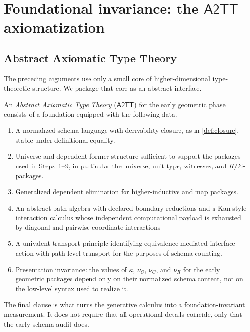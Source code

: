 \documentclass{lmcs}
\newcommand{\ATwoTT}{\mathsf{A2TT}}
\begin{document}
\section{Foundational invariance: the \texorpdfstring{$\ATwoTT$}{A2TT} axiomatization}
\label{sec:a2tt}

\subsection{Abstract Axiomatic Type Theory}

The preceding arguments use only a small core of higher-dimensional type-theoretic structure. We package that core as an abstract interface.

\begin{defi}
\label{def:a2tt}
An \emph{Abstract Axiomatic Type Theory} ($\ATwoTT$) for the early geometric phase consists of a foundation equipped with the following data.
\begin{enumerate}
    \item A normalized schema language with derivability closure, as in \autoref{def:closure}, stable under definitional equality.
    \item Universe and dependent-former structure sufficient to support the packages used in Steps~1--9, in particular the universe, unit type, witnesses, and $\Pi/\Sigma$-packages.
    \item Generalized dependent elimination for higher-inductive and map packages.
    \item An abstract path algebra with declared boundary reductions and a Kan-style interaction calculus whose independent computational payload is exhausted by diagonal and pairwise coordinate interactions.
    \item A univalent transport principle identifying equivalence-mediated interface action with path-level transport for the purposes of schema counting.
    \item Presentation invariance: the values of $\kappa$, $\nu_G$, $\nu_C$, and $\nu_H$ for the early geometric packages depend only on their normalized schema content, not on the low-level syntax used to realize it.
\end{enumerate}
\end{defi}

The final clause is what turns the generative calculus into a foundation-invariant measurement. It does not require that all operational details coincide, only that the early schema audit does.
\end{document}
